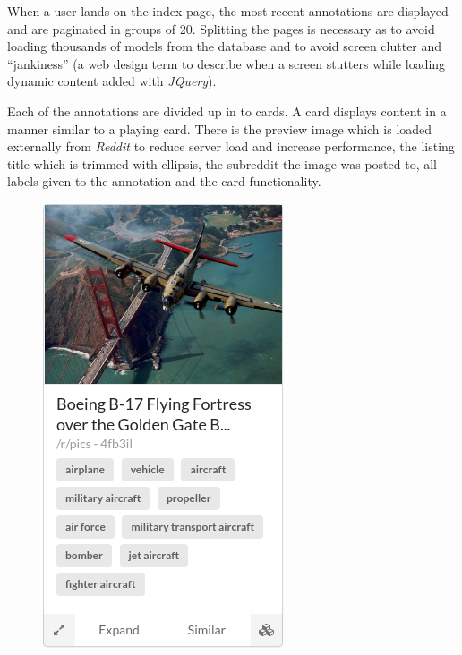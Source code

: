 \documentclass[msc,oneside]{ubcthesis}%
\begin{document}
When a user lands on the index page, the most recent annotations are displayed and are paginated in groups of 20. Splitting the pages is necessary as to avoid loading thousands of models from the database and to avoid screen clutter and ``jankiness'' (a web design term to describe when a screen stutters while loading dynamic content added with \textit{JQuery}).
\par
Each of the annotations are divided up in to cards. A card displays content in a manner similar to a playing card. There is the preview image which is loaded externally from \textit{Reddit} to reduce server load and increase performance, the listing title which is trimmed with ellipsis, the subreddit the image was posted to, all labels given to the annotation and the card functionality.
\begin{figure}[H]
\begin{multicols}{2}
    \includegraphics[width=\linewidth]{card.png}\par 

\end{multicols}
\end{figure}
\end{document}
